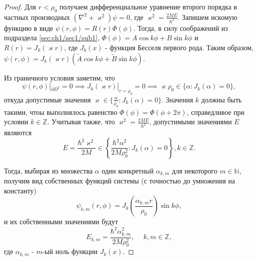\begin{proof}
Для $r < \rho_0$ получаем дифференциальное уравнение второго порядка в частных производных $(\nabla^2 + \varkappa^2)\psi = 0$, где $\varkappa^2 = \frac{2M E}{\hbar^2}$. Запишем искомую функцию в виде $\psi(r, \phi) = R(r)\Phi(\phi)$. Тогда, в силу соображений из подраздела \ref{sec:ch1/sec1/sub1}, $\Phi(\phi) = A\cos{k\phi} + B\sin{k\phi}$ и $R(r) = J_k(\varkappa r)$, где $J_k(x)$ - функция Бесселя первого рода. Таким образом, $\psi(r, \phi) = J_k(\varkappa r) (\widetilde{A}\cos{k\phi} + \widetilde{B}\sin{k\phi} )$.

Из граничного условия заметим, что $$\psi(r, \phi) |_{\partial D^2} = 0 \implies J_k(\varkappa r)|_{r=\rho_0} = 0 \implies \varkappa \rho_0 \in \{\alpha: J_k(\alpha) = 0\},$$
откуда допустимые значения $\varkappa \in \{ \frac{\alpha}{\rho_0} : J_k(\alpha)=0 \}$. Значения $k$ должны быть такими, чтоы выполнялось равенство $\Phi(\phi) = \Phi(\phi+2\pi)$, справедливое при условии $k \in \mathbb{Z}$. Учитывая также, что $\varkappa^2 = \frac{2M E}{\hbar^2}$, допустимыми значениями $E$ являются
$$E = \frac{\hbar^2\varkappa^2}{2M} \in \left\{ \frac{\hbar^2\alpha^2}{2M\rho_0^2}: J_k(\alpha)=0 \right\}, k \in \mathbb{Z}.$$

Тогда, выбирая из множества $\alpha$ один конкретный $\alpha_{k, m}$ для некоторого $m \in \mathbb{N}$, получим вид собственных функций системы (с точностью до умножения на константу) 
$$\psi_{k, m}(r, \phi) = J_k\left(\frac{\alpha_{k, m}r}{\rho_0}\right) \sin{k\phi},$$
и их собственными значениями будут
$$E_{k, m} = \frac{\hbar^2\alpha_{k, m}^2}{2M\rho_0^2}, \hspace{15pt} k, m \in \mathbb{Z},$$
где $\alpha_{k, m}$ - $m$-ый ноль функции $J_k(x)$.
\end{proof}


